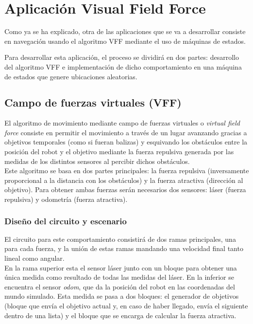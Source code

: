 \chapter{Aplicación Visual Field Force}
\label{cap:capitulo6}
Como ya se ha explicado, otra de las aplicaciones que se va a desarrollar consiste en navegación usando el algoritmo VFF mediante el uso de máquinas de estados.

Para desarrollar esta aplicación, el proceso se dividirá en dos partes: desarrollo del algoritmo VFF e implementación de dicho comportamiento
en una máquina de estados que genere ubicaciones aleatorias.

\section{Campo de fuerzas virtuales (VFF)}
\label{sec:VFF}

El algoritmo de movimiento mediante campo de fuerzas virtuales o \textit{virtual field force} consiste en permitir el movimiento a través de un lugar avanzando gracias a
objetivos temporales (como si fueran balizas) y esquivando los obstáculos entre la posición del robot y el objetivo mediante la fuerza repulsiva generada por las medidas
de los distintos sensores al percibir dichos obstáculos.\\

Este algoritmo se basa en dos partes principales: la fuerza repulsiva (inversamente proporcional a la distancia con los obstáculos) y la
fuerza atractiva (dirección al objetivo). Para obtener ambas fuerzas serán necesarios dos sensores: láser (fuerza repulsiva) y odometría (fuerza atractiva).\\

\subsection{Diseño del circuito y escenario}
\label{subsec:dis_bloques_VFF}

El circuito para este comportamiento consistirá de dos ramas principales, una para cada fuerza, y la unión de estas ramas mandando una velocidad final tanto lineal como angular.\\

En la rama superior esta el sensor láser junto con un bloque para obtener una única medida como resultado de todas las medidas del láser. En la inferior se encuentra el sensor
\textit{odom}, que da la posición del robot en las coordenadas del mundo simulado.
Esta medida se pasa a dos bloques: el generador de objetivos (bloque que envía el objetivo actual
y, en caso de haber llegado, envía el siguiente dentro de una lista) y el bloque que se encarga de calcular la fuerza atractiva.

